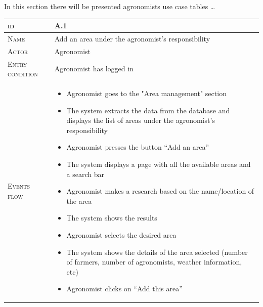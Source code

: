 In this section there will be presented agronomists use case tables \ldots

\begin{table}[H]
    \centering
    \begin{tabular}[c]{|l|p{}|}
        \hline %
    	\textsc{id}                 &   A.1\\
    	\hline %
    	\textsc{Name}               &   Add an area under the agronomist's responsibility\\
    	\hline %
    	\textsc{Actor}             &   Agronomist\\
    	\hline %
    	\textsc{Entry condition}   &   Agronomist has logged in\\
    	\hline %
    	\textsc{Events flow}         &   %
            	                        \begin{itemize}
                                    	    \item Agronomist goes to the "Area management" section
                                    	    \item The system extracts the data from the database and displays the list of areas under the agronomist's responsibility
                                    	    \item Agronomist presses the button “Add an area”
                                    		\item The system displays a page with all the available areas and a search bar
                                    		\item Agronomist makes a research based on the name/location of the area
                                    		\item The system shows the results
                                    		\item Agronomist selects the desired area
                                    		\item The system shows the details of the area selected (number of farmers, number of agronomists, weather information, etc)
                                    		\item Agronomist clicks on “Add this area”

\end{itemize}
\end{tabular}
\end{table}
